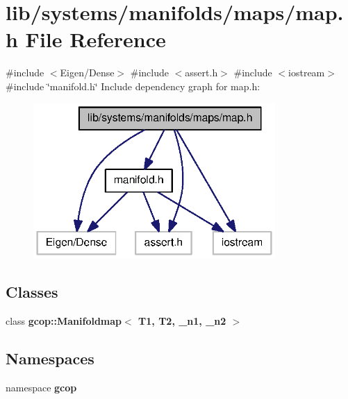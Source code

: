 \section{lib/systems/manifolds/maps/map.h \-File \-Reference}
\label{map_8h}
{\ttfamily \#include $<$\-Eigen/\-Dense$>$}\*
{\ttfamily \#include $<$assert.\-h$>$}\*
{\ttfamily \#include $<$iostream$>$}\*
{\ttfamily \#include \char`\"{}manifold.\-h\char`\"{}}\*
\-Include dependency graph for map.\-h\-:
\nopagebreak
\begin{figure}[H]
\begin{center}
\leavevmode
\includegraphics[width=261pt]{map_8h__incl}
\end{center}
\end{figure}
\subsection*{\-Classes}
\begin{DoxyCompactItemize}
\item 
class {\bf gcop\-::\-Manifoldmap$<$ T1, T2, \-\_\-n1, \-\_\-n2 $>$}
\end{DoxyCompactItemize}
\subsection*{\-Namespaces}
\begin{DoxyCompactItemize}
\item 
namespace {\bf gcop}
\end{DoxyCompactItemize}
